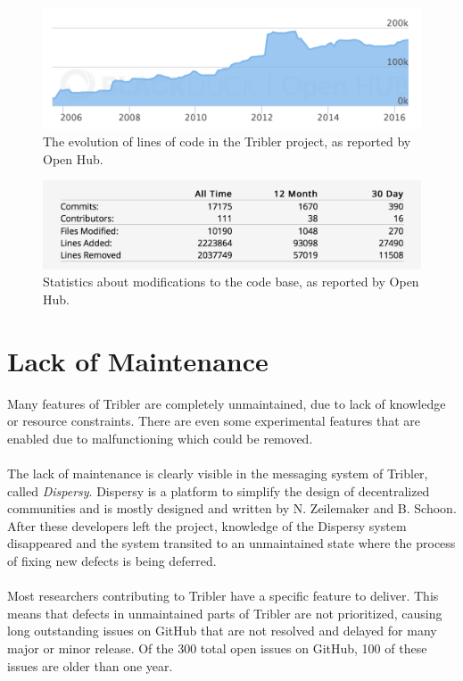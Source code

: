 \begin{figure}[!h]
	\centering
	\includegraphics[width=\columnwidth]{images/openhub_loc}
	\caption{The evolution of lines of code in the Tribler project, as reported by Open Hub.}
	\label{fig:openhub-loc}
\end{figure}

\begin{figure}[!h]
	\centering
	\includegraphics[width=0.7\columnwidth]{images/openhub_commits_table}
	\caption{Statistics about modifications to the code base, as reported by Open Hub.}
	\label{fig:openhub-commit-stats}
\end{figure}

\section{Lack of Maintenance}
Many features of Tribler are completely unmaintained, due to lack of knowledge or resource constraints. There are even some experimental features that are enabled due to malfunctioning which could be removed.\\\\
The lack of maintenance is clearly visible in the messaging system of Tribler, called \emph{Dispersy}. Dispersy is a platform to simplify the design of decentralized communities and is mostly designed and written by
N. Zeilemaker and B. Schoon\cite{zeilemaker2013dispersy}. After these developers left the project, knowledge of the Dispersy system disappeared and the system transited to an unmaintained state where the process of fixing new defects is being deferred.\\\\
Most researchers contributing to Tribler have a specific feature to deliver. This means that defects in unmaintained parts of Tribler are not prioritized, causing long outstanding issues on GitHub that are not resolved and delayed for many major or minor release. Of the 300 total open issues on GitHub, 100 of these issues are older than one year.
 
